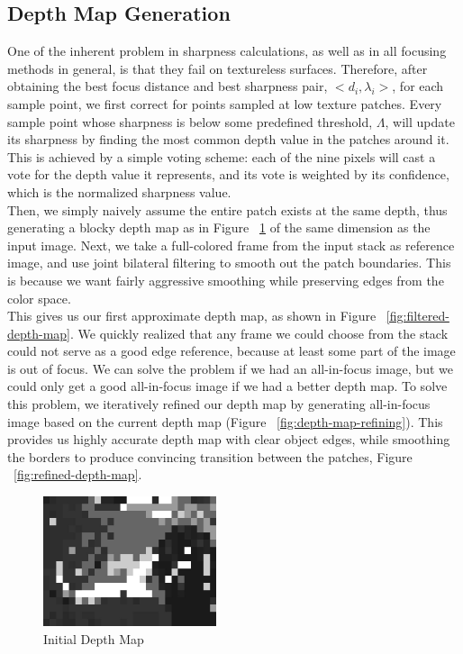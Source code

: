 \documentclass[annual, 12pt]{acmsiggraph}
\begin{document}
\subsection{Depth Map Generation}
\label{sec:depthmap-generation}
One of the inherent problem in sharpness calculations, as well as in all focusing methods in general, is that they fail on textureless surfaces.  Therefore, after obtaining the best focus distance and best sharpness pair, $<d_i, \lambda_i>$, for each sample point, we first correct for points sampled at low texture patches.  Every sample point whose sharpness is below some predefined threshold, $\Lambda$, will update its sharpness by finding the most common depth value in the patches around it.  This is achieved by a simple voting scheme: each of the nine pixels will cast a vote for the depth value it represents, and its vote is weighted by its confidence, which is the normalized sharpness value. \\

Then, we simply naively assume the entire patch exists at the same depth, thus generating a blocky depth map as in Figure ~\ref{fig:initial-depth-map} of the same dimension as the input image. Next, we take a full-colored frame from the input stack as reference image, and use joint bilateral filtering to smooth out the patch boundaries.  This is because we want fairly aggressive smoothing while preserving edges from the color space. \\
This gives us our first approximate depth map, as shown in Figure ~\ref{fig:filtered-depth-map}.  We quickly realized that any frame we could choose from the stack could not serve as a good edge reference, because at least some part of the image is out of focus.  We can solve the problem if we had an all-in-focus image, but we could only get a good all-in-focus image if we had a better depth map.  To solve this problem, we iteratively refined our depth map by generating all-in-focus image based on the current depth map (Figure ~\ref{fig:depth-map-refining}).  This provides us highly accurate depth map with clear object edges, while smoothing the borders to produce convincing transition between the patches, Figure ~\ref{fig:refined-depth-map}.
\begin{figure}
\centering
\includegraphics[height=1.5in]{images/initial-depth-map.jpg}
\caption{Initial Depth Map}
\label{fig:initial-depth-map}
\end{figure}
\end{document}
